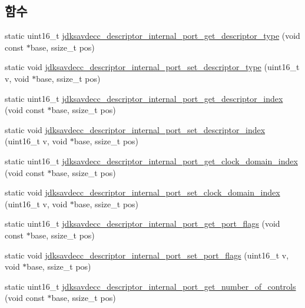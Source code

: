 \subsection*{함수}
\begin{DoxyCompactItemize}
\item 
static uint16\+\_\+t \hyperlink{group__descriptor__internal__port_gad5363efc03804b8e673e7cf5b92d153e}{jdksavdecc\+\_\+descriptor\+\_\+internal\+\_\+port\+\_\+get\+\_\+descriptor\+\_\+type} (void const $\ast$base, ssize\+\_\+t pos)
\item 
static void \hyperlink{group__descriptor__internal__port_ga2562608d08eff738332701b9fba95b47}{jdksavdecc\+\_\+descriptor\+\_\+internal\+\_\+port\+\_\+set\+\_\+descriptor\+\_\+type} (uint16\+\_\+t v, void $\ast$base, ssize\+\_\+t pos)
\item 
static uint16\+\_\+t \hyperlink{group__descriptor__internal__port_gadf62273d7e25f9e5f55483b9336d857c}{jdksavdecc\+\_\+descriptor\+\_\+internal\+\_\+port\+\_\+get\+\_\+descriptor\+\_\+index} (void const $\ast$base, ssize\+\_\+t pos)
\item 
static void \hyperlink{group__descriptor__internal__port_ga36bd33f8034ea733cd2c837082609adb}{jdksavdecc\+\_\+descriptor\+\_\+internal\+\_\+port\+\_\+set\+\_\+descriptor\+\_\+index} (uint16\+\_\+t v, void $\ast$base, ssize\+\_\+t pos)
\item 
static uint16\+\_\+t \hyperlink{group__descriptor__internal__port_gaa2fc99cc0fb83ba752ea98fdbe342b44}{jdksavdecc\+\_\+descriptor\+\_\+internal\+\_\+port\+\_\+get\+\_\+clock\+\_\+domain\+\_\+index} (void const $\ast$base, ssize\+\_\+t pos)
\item 
static void \hyperlink{group__descriptor__internal__port_ga1e191cb1adb0bfe2e78a2eea70ad6e52}{jdksavdecc\+\_\+descriptor\+\_\+internal\+\_\+port\+\_\+set\+\_\+clock\+\_\+domain\+\_\+index} (uint16\+\_\+t v, void $\ast$base, ssize\+\_\+t pos)
\item 
static uint16\+\_\+t \hyperlink{group__descriptor__internal__port_ga6a26b630da20cebe40f8a93d1ea2e11b}{jdksavdecc\+\_\+descriptor\+\_\+internal\+\_\+port\+\_\+get\+\_\+port\+\_\+flags} (void const $\ast$base, ssize\+\_\+t pos)
\item 
static void \hyperlink{group__descriptor__internal__port_gafb65af31cf756288670103ef0228d290}{jdksavdecc\+\_\+descriptor\+\_\+internal\+\_\+port\+\_\+set\+\_\+port\+\_\+flags} (uint16\+\_\+t v, void $\ast$base, ssize\+\_\+t pos)
\item 
static uint16\+\_\+t \hyperlink{group__descriptor__internal__port_gaad13876a68a22d37aceb566566729e13}{jdksavdecc\+\_\+descriptor\+\_\+internal\+\_\+port\+\_\+get\+\_\+number\+\_\+of\+\_\+controls} (void const $\ast$base, ssize\+\_\+t pos)

\end{DoxyCompactItemize}
